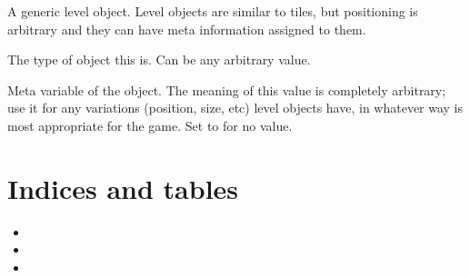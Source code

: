 \documentclass[letterpaper,10pt,english]{sphinxmanual}
\begin{document}

\begin{fulllineitems}
\label{\detokenize{index:ulvl.LevelObject}}
A generic level object.  Level objects are similar to tiles, but
positioning is arbitrary and they can have meta information assigned
to them.

\begin{fulllineitems}
\label{\detokenize{index:ulvl.LevelObject.type}}
The type of object this is.  Can be any arbitrary value.

\end{fulllineitems}


\begin{fulllineitems}
\label{\detokenize{index:ulvl.LevelObject.meta}}
Meta variable of the object.  The meaning of this value is
completely arbitrary; use it for any variations (position, size,
etc) level objects have, in whatever way is most appropriate for
the game.  Set to  for no value.

\end{fulllineitems}


\end{fulllineitems}



\chapter{Indices and tables}
\label{\detokenize{index:indices-and-tables}}\begin{itemize}
\item {} 

\item {} 

\item {} 

\end{itemize}


\renewcommand{\indexname}{Python Module Index}
\begin{sphinxtheindex}
\let\bigletter\sphinxstyleindexlettergroup
\bigletter{u}
\item\relax{}
\end{sphinxtheindex}

\renewcommand{\indexname}{Index}
\printindex
\end{document}
